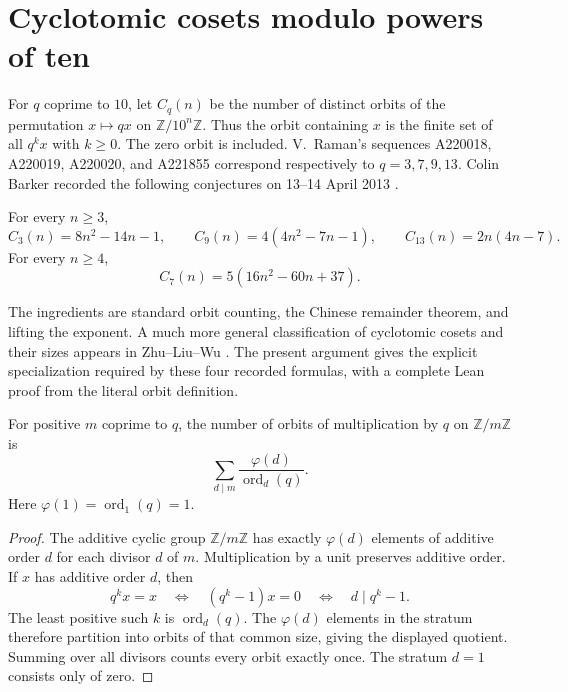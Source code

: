 \section{Cyclotomic cosets modulo powers of ten}\label{sec:cosets-ten}

For $q$ coprime to $10$, let $C_q(n)$ be the number of distinct
orbits of the permutation $x\mapsto qx$ on $\mathbb Z/10^n\mathbb Z$.
Thus the orbit containing $x$ is the finite set of all $q^kx$ with
$k\ge0$. The zero orbit is included. V.~Raman's sequences
A220018, A220019, A220020, and A221855 correspond respectively to
$q=3,7,9,13$. Colin Barker recorded the following conjectures on
13--14 April 2013 \cite{oeis220018,oeis220019,oeis220020,oeis221855}.

\begin{theorem}\label{thm:cosets-ten}
For every $n\ge3$,
\[
 C_3(n)=8n^2-14n-1,\qquad
 C_9(n)=4(4n^2-7n-1),\qquad
 C_{13}(n)=2n(4n-7).
\]
For every $n\ge4$,
\[
 C_7(n)=5(16n^2-60n+37).
\]
\end{theorem}

The ingredients are standard orbit counting, the Chinese remainder
theorem, and lifting the exponent. A much more general classification
of cyclotomic cosets and their sizes appears in Zhu--Liu--Wu
\cite{zhu-liu-wu-cosets}. The present argument gives the explicit
specialization required by these four recorded formulas, with a
complete Lean proof from the literal orbit definition.

\begin{lemma}\label{lem:cosets-divisors}
For positive $m$ coprime to $q$, the number of orbits of multiplication
by $q$ on $\mathbb Z/m\mathbb Z$ is
\[
 \sum_{d\mid m}\frac{\varphi(d)}{\operatorname{ord}_d(q)}.
\]
Here $\varphi(1)=\operatorname{ord}_1(q)=1$.
\end{lemma}
\begin{proof}
The additive cyclic group $\mathbb Z/m\mathbb Z$ has exactly
$\varphi(d)$ elements of additive order $d$ for each divisor $d$ of
$m$. Multiplication by a unit preserves additive order. If $x$ has
additive order $d$, then
\[
 q^kx=x\quad\Longleftrightarrow\quad(q^k-1)x=0
 \quad\Longleftrightarrow\quad d\mid q^k-1.
\]
The least positive such $k$ is $\operatorname{ord}_d(q)$.
The $\varphi(d)$ elements in the stratum therefore partition into
orbits of that common size, giving the displayed quotient.
Summing over all divisors counts every orbit exactly once.
The stratum $d=1$ consists only of zero.
\end{proof}

